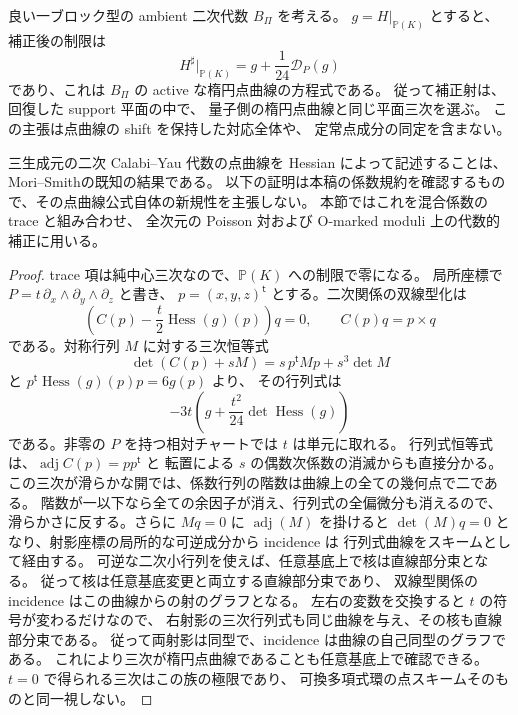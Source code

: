 \begin{proposition}[楕円点曲線との厳密な整合]
\label{prop:nfm-correction-point-cubic}
良い一ブロック型の ambient 二次代数 $B_\Pi$ を考える。
$g=H|_{\mathbb P(K)}$ とすると、補正後の制限は
\[
 H^\sharp|_{\mathbb P(K)}
 =g+\frac1{24}\mathcal D_P(g)
\]
であり、これは $B_\Pi$ の active な楕円点曲線の方程式である。
従って補正射は、回復した support 平面の中で、
量子側の楕円点曲線と同じ平面三次を選ぶ。
この主張は点曲線の shift を保持した対応全体や、
定常点成分の同定を含まない。
\end{proposition}

三生成元の二次 Calabi--Yau 代数の点曲線を Hessian によって記述することは、
Mori--Smith\cite[Theorems~1.2, 7.2]{MoriSmith}の既知の結果である。
以下の証明は本稿の係数規約を確認するもので、その点曲線公式自体の新規性を主張しない。
本節ではこれを混合係数の trace と組み合わせ、
全次元の Poisson 対および O-marked moduli 上の代数的補正に用いる。

\begin{proof}
trace 項は純中心三次なので、$\mathbb P(K)$ への制限で零になる。
局所座標で $P=t\,\partial_x\wedge\partial_y\wedge\partial_z$ と書き、
$p=(x,y,z)^{\mathsf t}$ とする。二次関係の双線型化は
\[
 \left(C(p)-\frac t2\operatorname{Hess}(g)(p)\right)q=0,
 \qquad C(p)q=p\times q
\]
である。対称行列 $M$ に対する三次恒等式
\[
 \det(C(p)+sM)=s\,p^{\mathsf t}Mp+s^3\det M
\]
と $p^{\mathsf t}\operatorname{Hess}(g)(p)p=6g(p)$ より、
その行列式は
\[
 -3t\left(g+\frac{t^2}{24}\det\operatorname{Hess}(g)\right)
\]
である。非零の $P$ を持つ相対チャートでは $t$ は単元に取れる。
行列式恒等式は、$\operatorname{adj}C(p)=pp^{\mathsf t}$ と
転置による $s$ の偶数次係数の消滅からも直接分かる。
この三次が滑らかな開では、係数行列の階数は曲線上の全ての幾何点で二である。
階数が一以下なら全ての余因子が消え、行列式の全偏微分も消えるので、
滑らかさに反する。さらに $Mq=0$ に $\operatorname{adj}(M)$ を掛けると
$\det(M)q=0$ となり、射影座標の局所的な可逆成分から incidence は
行列式曲線をスキームとして経由する。
可逆な二次小行列を使えば、任意基底上で核は直線部分束となる。
従って核は任意基底変更と両立する直線部分束であり、
双線型関係の incidence はこの曲線からの射のグラフとなる。
左右の変数を交換すると $t$ の符号が変わるだけなので、
右射影の三次行列式も同じ曲線を与え、その核も直線部分束である。
従って両射影は同型で、incidence は曲線の自己同型のグラフである。
これにより三次が楕円点曲線であることも任意基底上で確認できる。
$t=0$ で得られる三次はこの族の極限であり、
可換多項式環の点スキームそのものと同一視しない。
\end{proof}

